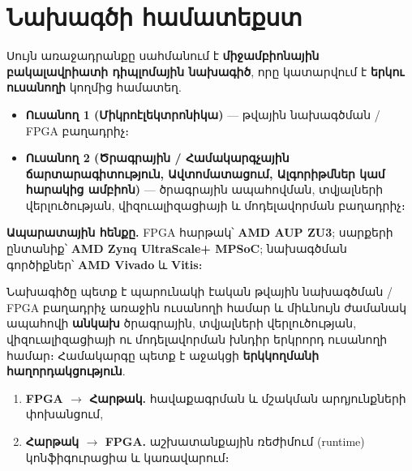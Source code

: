 \chapter{Նախագծի համատեքստ}
\label{ch:context}

Սույն առաջադրանքը սահմանում է \textbf{միջամբիոնային բակալավրիատի դիպլոմային
նախագիծ}, որը կատարվում է \textbf{երկու ուսանողի} կողմից համատեղ.

\begin{itemize}
  \item \textbf{Ուսանող 1 (Միկրոէլեկտրոնիկա)} — թվային նախագծման / FPGA բաղադրիչ։
  \item \textbf{Ուսանող 2 (Ծրագրային / Համակարգչային ճարտարագիտություն,
        Ավտոմատացում, Ալգորիթմներ կամ հարակից ամբիոն)} — ծրագրային ապահովման,
        տվյալների վերլուծության, վիզուալիզացիայի և մոդելավորման բաղադրիչ։
\end{itemize}

\textbf{Ապարատային հենքը.} FPGA հարթակ՝ \textbf{AMD AUP ZU3}; սարքերի ընտանիք՝
\textbf{AMD Zynq UltraScale+ MPSoC}; նախագծման գործիքներ՝ \textbf{AMD Vivado} և \textbf{Vitis}։

Նախագիծը պետք է պարունակի էական թվային նախագծման / FPGA բաղադրիչ առաջին ուսանողի
համար և միևնույն ժամանակ ապահովի \textbf{անկախ} ծրագրային, տվյալների վերլուծության,
վիզուալիզացիայի ու մոդելավորման խնդիր երկրորդ ուսանողի համար։ Համակարգը պետք է
աջակցի \textbf{երկկողմանի հաղորդակցություն}.
\begin{enumerate}
  \item \textbf{FPGA $\rightarrow$ Հարթակ.} հավաքագրման և մշակման արդյունքների փոխանցում,
  \item \textbf{Հարթակ $\rightarrow$ FPGA.} աշխատանքային ռեժիմում (runtime) կոնֆիգուրացիա և կառավարում։
\end{enumerate}
